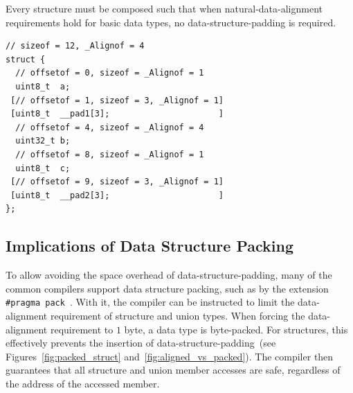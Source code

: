 \begin{requirement}
  Every structure must be composed such that when \gls{natural-data-alignment} requirements hold for basic data types, no \gls{data-structure-padding} is required.
\end{requirement}



\begin{lstfloat}[ht]
  \centering
  \begin{lstlisting}[style=c]
// sizeof = 12, _Alignof = 4
struct {
  // offsetof = 0, sizeof = _Alignof = 1
  uint8_t  a;
 [// offsetof = 1, sizeof = 3, _Alignof = 1]
 [uint8_t  __pad1[3];                      ]
  // offsetof = 4, sizeof = _Alignof = 4
  uint32_t b;
  // offsetof = 8, sizeof = _Alignof = 1
  uint8_t  c;
 [// offsetof = 9, sizeof = 3, _Alignof = 1]
 [uint8_t  __pad2[3];                      ]
};
  \end{lstlisting}
  \caption{C Structure Padding.}
  \label{fig:struct_pad}
  \caption*{The explicitly declared members of the structure are \lstinline{a} and \lstinline{b}. The structure is not \gls{byte-packed}, and we assume \gls{natural-data-alignment} requirements hold. As \lstinline{b} must have its \gls{data-alignment} requirement of $8$ \glspl{byte} met, the compiler inserts \gls{data-structure-padding} preceding this structure member, here illustrated as the undeclared structure member \lstinline{p}~(not technically accurate). This \gls{data-structure-padding} is not directly accessible, and its content is undefined at all times.}
\end{lstfloat}

\subsection{Implications of Data Structure Packing}

To allow avoiding the space overhead of \gls{data-structure-padding}, many of the common compilers support data structure packing, such as by the  extension \lstinline{#pragma pack}~\cite{msft-pack}. With it, the compiler can be instructed to limit the \gls{data-alignment} requirement of structure and union types. When forcing the \gls{data-alignment} requirement to $1$ \gls{byte}, a data type is \gls{byte-packed}. For structures, this effectively prevents the insertion of \gls{data-structure-padding}~(see Figures~\ref{fig:packed_struct} and~\ref{fig:aligned_vs_packed}). The compiler then guarantees that all structure and union member accesses are safe, regardless of the address of the accessed member.

